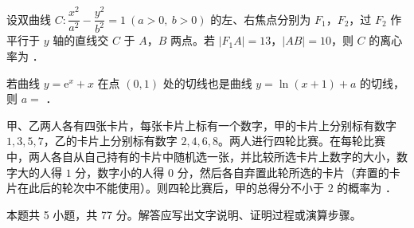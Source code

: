 \begin{question}
设双曲线 $C:\dfrac{x^{2}}{a^{2}}-\dfrac{y^{2}}{b^{2}}=1\ (a>0,\ b>0)$ 的左、右焦点分别为 $F_1$，$F_2$，过 $F_2$ 作平行于 $y$ 轴的直线交 $C$ 于 $A$，$B$ 两点。若 $|F_1A|=13$，$|AB|=10$，则 $C$ 的离心率为 \gkblank{}．

\end{question}
\begin{question}
若曲线 $y=\mathrm{e}^{x}+x$ 在点 $(0,1)$ 处的切线也是曲线 $y=\ln(x+1)+a$ 的切线，则 $a=$ \gkblank{}．

\end{question}
\begin{question}
甲、乙两人各有四张卡片，每张卡片上标有一个数字，甲的卡片上分别标有数字 $1,3,5,7$，乙的卡片上分别标有数字 $2,4,6,8$。两人进行四轮比赛。在每轮比赛中，两人各自从自己持有的卡片中随机选一张，并比较所选卡片上数字的大小，数字大的人得 $1$ 分，数字小的人得 $0$ 分，然后各自弃置此轮所选的卡片（弃置的卡片在此后的轮次中不能使用）。则四轮比赛后，甲的总得分不小于 $2$ 的概率为 \gkblank{}．

\par\medskip

\end{question}

\begin{gktip}
本题共 5 小题，共 77 分。解答应写出文字说明、证明过程或演算步骤。
\end{gktip}

